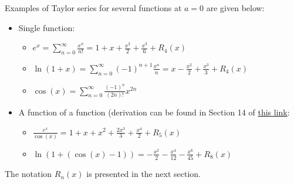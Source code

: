 \begin{center}
\begin{footnotesize}
\end{footnotesize}
\end{center}

Examples of Taylor series for several functions at $a = 0$ are given below:
\begin{itemize}
	\item Single function:
	\begin{itemize}
		\item $e^{x} = \sum_{n=0}^\infty \frac{x^n}{n!} = 1 + x + \frac{x^2}{2} + \frac{x^3}{6} + R_4(x)$
		\item $\ln(1+x) = \sum_{n=0}^\infty (-1)^{n+1} \frac{x^n}{n} = x - \frac{x^2}{2} + \frac{x^3}{3} + R_4(x)$
		\item $\cos(x) = \sum_{n=0}^\infty \frac{(-1)^n}{(2n)!} x^{2n}$
	\end{itemize} 
	\item A function of a function (derivation can be found in Section 14 of \href{https://en.wikipedia.org/wiki/Taylor_series}{this link}:
	\begin{itemize}
		\item $\frac{e^x}{\cos(x)} = 1 + x + x^2 + \frac{2x^3}{3} + \frac{x^4}{2} + R_5(x)$
		\item $\ln(1 + (\cos(x) - 1)) = -\frac{x^2}{2} - \frac{x^4}{12} - \frac{x^6}{45} + R_8(x)$
\end{itemize} 
\end{itemize}
The notation $R_n(x)$ is presented in the next section.



